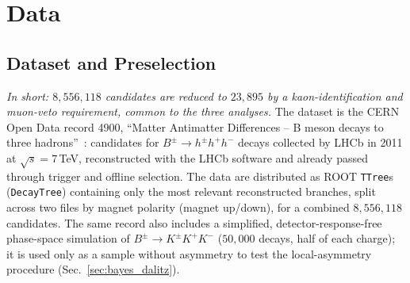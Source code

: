 \section{Data}
\label{sec:data}

\subsection{Dataset and Preselection}
\label{sec:data_presel}
\emph{In short: $8{,}556{,}118$ candidates are reduced to $23{,}895$ by a kaon-identification and muon-veto requirement, common to the three analyses.}
The dataset is the CERN Open Data record 4900, ``Matter Antimatter Differences -- B meson decays to three hadrons''~\cite{opendata_record}: candidates for $B^{\pm}\to h^{\pm}h^{+}h^{-}$ decays collected by LHCb in 2011 at $\sqrt{s}=7$\,TeV, reconstructed with the LHCb software and already passed through trigger and offline selection. The data are distributed as ROOT \texttt{TTree}s (\texttt{DecayTree}) containing only the most relevant reconstructed branches, split across two files by magnet polarity (magnet up/down), for a combined $8{,}556{,}118$ candidates. The same record also includes a simplified, detector-response-free phase-space simulation of $B^{\pm}\to K^{\pm}K^{+}K^{-}$ ($50{,}000$ decays, half of each charge); it is used only as a sample without asymmetry to test the local-asymmetry procedure (Sec.~\ref{sec:bayes_dalitz}).

\begin{table}[h]
\centering
{}
\caption{Number of candidates passing each requirement alone and after the cumulative selection, in the order of the table, and by magnet polarity. The kaon-identification requirement on the three tracks is by far the most selective.}
\label{tab:cutflow}
\end{table}

